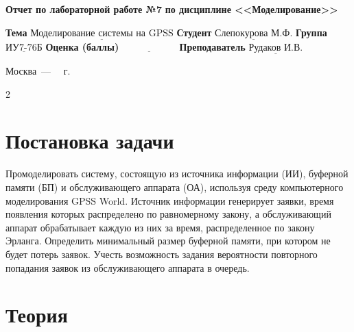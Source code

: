 \documentclass[12pt]{report}
\begin{document}
\begin{titlepage}
		\begin{center}
			\noindent\begin{minipage}{1.1\textwidth}\centering
				\Large\textbf{Отчет по лабораторной работе №7}\newline
				\textbf{по дисциплине <<Моделирование>>}\newline\newline
			\end{minipage}
		\end{center}
		
		\noindent\textbf{Тема} $\underline{\text{Моделирование системы на GPSS}}$\newline\newline
		\noindent\textbf{Студент} $\underline{\text{Слепокурова М.Ф.}}$\newline\newline
		\noindent\textbf{Группа} $\underline{\text{ИУ7-76Б}}$\newline\newline
		\noindent\textbf{Оценка (баллы)} $\underline{\text{~~~~~~~~~~~~~~~~~}}$\newline\newline
		\noindent\textbf{Преподаватель} $\underline{\text{Рудаков И.В.}}$\newline\newline\newline
		
		\begin{center}
			\vfill
			Москва~---~\the\year
			~г.
		\end{center}
	\end{titlepage}

\setcounter{page} {2}


\section*{Постановка задачи}
Промоделировать систему, состоящую из источника информации (ИИ), буферной памяти (БП) и обслуживающего аппарата (ОА), используя среду компьютерного моделирования GPSS World. Источник информации генерирует заявки, время появления которых распределено по равномерному закону, а обслуживающий аппарат обрабатывает каждую из них за время, распределенное по закону Эрланга.
Определить минимальный размер буферной памяти, при котором не будет потерь заявок. Учесть возможность задания вероятности повторного попадания заявок из обслуживающего аппарата в очередь.


\section*{Теория}
\end{document}
